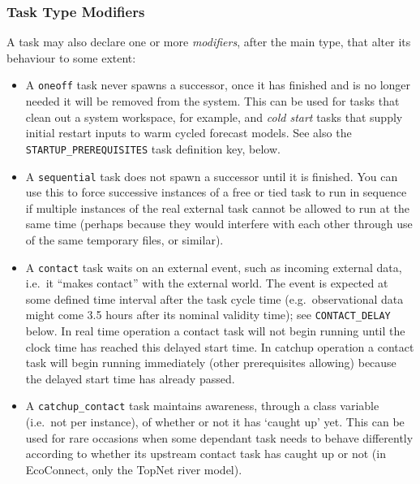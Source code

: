 \documentclass[11pt,a4paper]{article}
\begin{document}
\subsubsection{Task Type Modifiers} 

A task may also declare one or more {\em modifiers}, after the main
type, that alter its behaviour to some extent:

\begin{itemize}
    \item A \lstinline=oneoff= task never spawns a successor, once it
        has finished and is no longer needed it will be removed from the
        system. This can be used for tasks that clean out a system 
        workspace, for example, and {\em cold start} tasks that supply
        initial restart inputs to warm cycled forecast models. See also
        the \lstinline=STARTUP_PREREQUISITES= task definition key, below.

    \item A \lstinline=sequential= task does not spawn a successor until it is
        finished. You can use this to force successive instances of a
        free or tied task to run in sequence if multiple instances of
        the real external task cannot be allowed to run at the same
        time (perhaps because they would interfere with each other
        through use of the same temporary files, or similar).

    \item A \lstinline=contact= task waits on an external event, such as
        incoming external data, i.e.\ it ``makes contact'' with the
        external world.  The event is expected at some defined time
        interval after the task cycle time (e.g.\ observational data
        might come 3.5 hours after its nominal validity time); see
        \lstinline=CONTACT_DELAY= below. In real time operation a contact task will
        not begin running until the clock time has reached this delayed
        start time. In catchup operation a contact task will begin
        running immediately (other prerequisites allowing) because the
        delayed start time has already passed.  
        
    \item A \lstinline=catchup_contact= task maintains awareness,
        through a class variable (i.e.\ not per instance), of whether or
        not it has `caught up' yet.  This can be used for rare occasions
        when some dependant task needs to behave differently according
        to whether its upstream contact task has caught up or not (in
        EcoConnect, only the TopNet river model).


\end{itemize}
\end{document}
